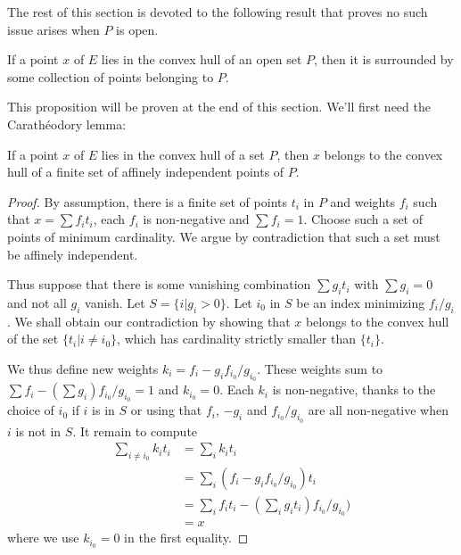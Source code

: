\documentclass[10pt,a4paper]{article}
\newcommand{\uses}[1]{}
\newcommand{\lean}[1]{}
\newcommand{\leanok}{}
\begin{document}
The rest of this section is devoted to the following result that proves no such issue arises
when $P$ is open.

\begin{proposition}
  \label{prop:surrounded_by_open}
  \uses{def:surrounds_points}
  \lean{surrounded_of_convexHull}\leanok
  If a point $x$ of $E$ lies in the convex hull of an open set $P$,
  then it is surrounded by some collection of points belonging to $P$.
\end{proposition}

This proposition will be proven at the end of this section.
We'll first need the Carathéodory lemma:

\begin{lemma}
\label{lem:caratheodory}
\lean{convexHull_eq_union}
\leanok
  If a point $x$ of $E$ lies in the convex hull of a set $P$, then $x$
  belongs to the convex hull of a finite set of affinely independent points
  of $P$.
\end{lemma}

\begin{proof}
  \leanok
  By assumption, there is a finite set of points $t_i$ in $P$ and
  weights $f_i$ such that $x = \sum f_i t_i$, each $f_i$ is non-negative
  and $\sum f_i = 1$.
  Choose such a set of points of minimum cardinality. We argue by
  contradiction that such a set must be affinely independent.

  Thus suppose that there is some vanishing combination $\sum g_i t_i$ with
  $\sum g_i = 0$ and not all $g_i$ vanish.
  Let $S = \{i | g_i > 0\}$.
  Let $i_0$ in $S$ be an index minimizing $f_i/g_i$. We shall obtain our
  contradiction by showing that $x$ belongs to the convex hull of the set
  $\{t_i| i \ne i_0\}$, which has cardinality strictly smaller than
  $\{t_i\}$.

  We thus define new weights $k_i = f_i - g_i f_{i_0}/g_{i_0}$.
  These weights sum to $\sum f_i - (\sum g_i)f_{i_0}/g_{i_0} = 1$
  and $k_{i_0} = 0$.
  Each $k_i$ is non-negative, thanks to the choice of $i_0$ if
  $i$ is in $S$ or using that $f_i$, $-g_i$ and $f_{i_0}/g_{i_0}$
  are all non-negative when $i$ is not in $S$.
  It remain to compute
  \begin{align*}
    \sum_{i ≠ i_0} k_i t_i &= \sum_i k_i t_i \\
      &= \sum_i (f_i - g_i f_{i_0}/g_{i_0}) t_i  \\
      &= \sum_i f_i t_i - \left(\sum_i g_i t_i\right)f_{i_0}/g_{i_0})   \\
      &= x
  \end{align*}
  where we use $k_{i_0} = 0$ in the first equality.
\end{proof}
\end{document}
